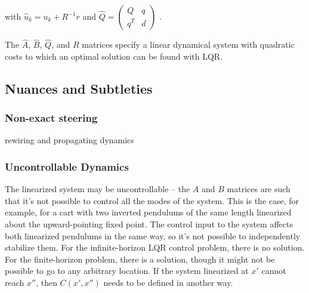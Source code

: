\documentclass[letterpaper, 10pt, english, conference]{IEEEtran}
\begin{document}
with $\hat{u}_{k}=u_{k}+R^{-1}r$ and $\hat{Q}=\left(\begin{matrix}Q & q\\
q^{T} & d
\end{matrix}\right)$ .

The $\hat{A}$, $\hat{B}$, $\hat{Q}$, and $R$ matrices specify
a linear dynamical system with quadratic costs to which an optimal
solution can be found with LQR.


\subsection{Nuances and Subtleties}


\subsubsection{Non-exact steering}

rewiring and propagating dynamics


\subsubsection{Uncontrollable Dynamics}

The linearized system may be uncontrollable -- the $A$ and $B$ matrices
are such that it's not possible to control all the modes of the system.
This is the case, for example, for a cart with two inverted pendulums
of the same length linearized about the upward-pointing fixed point.
The control input to the system affects both linearized pendulums
in the same way, so it's not possible to independently stabilize them.
For the infinite-horizon LQR control problem, there is no solution.
For the finite-horizon problem, there is a solution, though it might
not be possible to go to any arbitrary location. If the system linearized
at $x'$ cannot reach $x''$, then $C\left(x',x''\right)$ needs to
be defined in another way.
\end{document}
